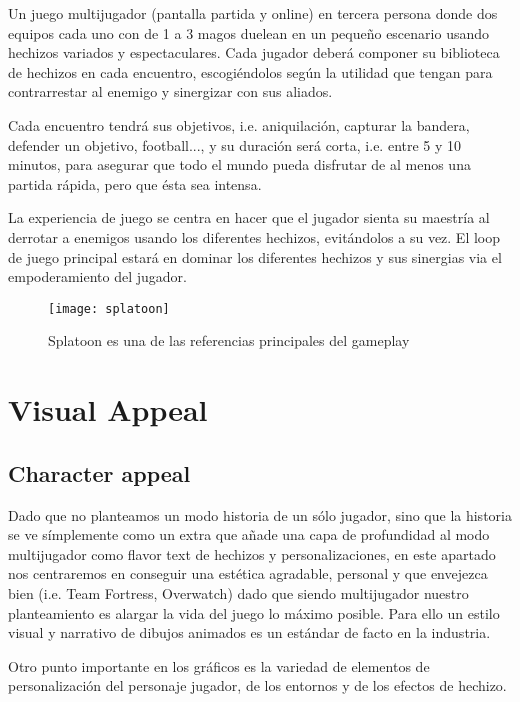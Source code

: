 \documentclass[12pt]{article}
\begin{document}
Un juego multijugador (pantalla partida y online) en tercera persona donde dos equipos cada uno con de 1 a 3 magos duelean en un pequeño escenario usando hechizos variados y espectaculares. Cada jugador deberá componer su biblioteca de hechizos en cada encuentro, escogiéndolos según la utilidad que tengan para contrarrestar al enemigo y sinergizar con sus aliados. 

Cada encuentro tendrá sus objetivos, i.e. aniquilación, capturar la bandera, defender un objetivo, football..., y su duración será corta, i.e. entre 5 y 10 minutos, para asegurar que todo el mundo pueda disfrutar de al menos una partida rápida, pero que ésta sea intensa.

La experiencia de juego se centra en hacer que el jugador sienta su maestría al derrotar a enemigos usando los diferentes hechizos, evitándolos a su vez. El loop de juego principal estará en dominar los diferentes hechizos y sus sinergias via el empoderamiento del jugador.

\begin{figure}[h]
    \centering
    \texttt{[image: splatoon]}
    \caption{Splatoon es una de las referencias principales del gameplay}
\end{figure}

\newpage

\section{Visual Appeal}

\subsection{Character appeal}

Dado que no planteamos un modo historia de un sólo jugador, sino que la historia se ve símplemente como un extra que añade una capa de profundidad al modo multijugador como flavor text de hechizos y personalizaciones, en este apartado nos centraremos en conseguir una estética agradable, personal y que envejezca bien (i.e. Team Fortress, Overwatch) dado que siendo multijugador nuestro planteamiento es alargar la vida del juego lo máximo posible. Para ello un estilo visual y narrativo de dibujos animados es un estándar de facto en la industria.

Otro punto importante en los gráficos es la variedad de elementos de personalización del personaje jugador, de los entornos y de los efectos de hechizo.
\end{document}
